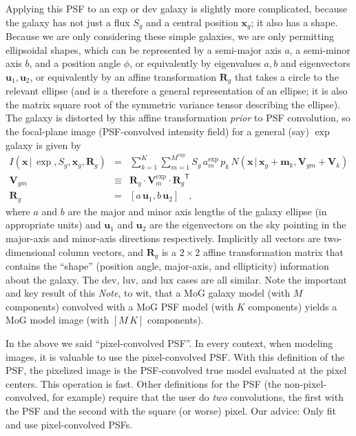 \documentclass[12pt,pdftex,preprint]{aastex}
\newcommand{\documentname}{\textsl{Note}}
\newcommand{\tmatrix}[1]{\boldsymbol{#1}}
\newcommand{\transpose}[1]{{#1}^{\mathsf T}}
\newcommand{\tvector}[1]{\boldsymbol{#1}}
\newcommand{\pos}{\tvector{x}}
\newcommand{\mean}{\tvector{m}}
\newcommand{\var}{\tmatrix{V}}
\newcommand{\affine}{\tmatrix{R}}
\newcommand{\uv}{\tvector{u}}
\newcommand{\normal}{N}
\newcommand{\given}{\,|\,}
\newcommand{\dev}{\mathrm{dev}}
\newcommand{\lux}{\mathrm{lux}}
\newcommand{\luv}{\mathrm{luv}}
\begin{document}
Applying this PSF to an exp or dev galaxy is slightly more
complicated, because the galaxy has not just a flux $S_g$ and a
central position $\pos_g$; it also has a shape.  Because we are only
considering these simple galaxies, we are only permitting ellipsoidal
shapes, which can be represented by a semi-major axis $a$, a
semi-minor axis $b$, and a position angle $\phi$, or equivalently by
eigenvalues $a, b$ and eigenvectors $\uv_1, \uv_2$, or equivalently by
an affine transformation $\affine_g$ that takes a circle to the
relevant ellipse (and is a therefore a general representation of an
ellipse; it is also the matrix square root of the symmetric variance
tensor describing the ellipse).  The galaxy is distorted by this
affine transformation \emph{prior} to PSF convolution, so the
focal-plane image (PSF-convolved intensity field) for a general (say)
$\exp$ galaxy is given by
\begin{eqnarray}\displaystyle
I(\pos\given\exp,S_g,\pos_g,\affine_g) &=& \sum_{k=1}^K \sum_{m=1}^{M^{\exp}} S_g\,a^{\exp}_m\,p_k\,\normal(\pos\given\pos_g+\mean_k,\var_{gm}+\var_k)
\\
\var_{gm} &\equiv& \affine_g\cdot\var^{\exp}_m\cdot\transpose{\affine_g}
\\
\affine_g &=& \left[a\,\uv_1 , b\,\uv_2 \right]
\quad ,
\end{eqnarray}
where $a$ and $b$ are the major and minor axis lengths of the galaxy
ellipse (in appropriate units) and $\uv_1$ and $\uv_2$ are the
eigenvectors on the sky pointing in the major-axis and minor-axis
directions respectively.  Implicitly all vectors are two-dimensional
column vectors, and $\affine_g$ is a $2\times 2$ affine transformation
matrix that contains the ``shape'' (position angle, major-axis, and
ellipticity) information about the galaxy.  The $\dev$, $\luv$, and
$\lux$ cases are all similar.  Note the important and key result of
this \documentname, to wit, that a MoG galaxy model (with $M$
components) convolved with a MoG PSF model (with $K$ components)
yields a MoG model image (with $[M\,K]$ components).

In the above we said ``pixel-convolved PSF''.  In every context, when
modeling images, it is valuable to use the pixel-convolved PSF.  With
this definition of the PSF, the pixelized image is the PSF-convolved
true model evaluated at the pixel centers.  This operation is fast.
Other definitions for the PSF (the non-pixel-convolved, for example)
require that the user do \emph{two} convolutions, the first with the
PSF and the second with the square (or worse) pixel.  Our advice: Only
fit and use pixel-convolved PSFs.
\end{document}
